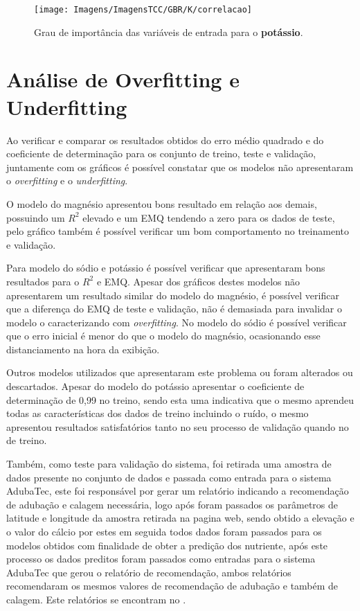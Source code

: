 \documentclass[
12pt,				%
oneside,			%
a4paper,			%
english,			%
french,				%
spanish,			%
brazil				%
]{abntex2}
\begin{document}
\begin{figure}[H]
	\caption{Grau de importância das variáveis de entrada para o \textbf{potássio}.}
	\centering %
	\texttt{[image: Imagens/ImagensTCC/GBR/K/correlacao]} %
	\label{fig:gkcorrelacao}
\end{figure}

\section{Análise de Overfitting e Underfitting}

Ao verificar e comparar os resultados obtidos do erro médio quadrado e do coeficiente de determinação para os conjunto de treino, teste e validação, juntamente com os gráficos é possível constatar que os modelos  não apresentaram o \textit{overfitting} e o \textit{underfitting}. 

O modelo do magnésio apresentou bons resultado em relação aos demais, possuindo um $R^2$ elevado e um EMQ tendendo a zero para os dados de teste, pelo gráfico também é possível verificar um bom comportamento no treinamento e validação. 

Para modelo do sódio e potássio é possível verificar que apresentaram bons resultados para o $R^2$ e EMQ. Apesar dos gráficos destes modelos não apresentarem um resultado similar do modelo do magnésio, é possível verificar que a diferença do EMQ de teste e validação, não é demasiada para invalidar o modelo o caracterizando com \textit{overfitting}. No modelo do sódio é possível verificar que o erro inicial é menor do que o modelo do magnésio, ocasionando esse distanciamento na hora da exibição.   

Outros modelos utilizados que apresentaram este problema ou foram alterados ou descartados. Apesar do modelo do potássio apresentar o coeficiente de determinação de 0,99 no treino, sendo esta uma indicativa que o mesmo aprendeu todas as características dos dados de treino incluindo o ruído, o mesmo apresentou resultados satisfatórios tanto no seu processo de validação quando no de treino.

Também, como teste para validação do sistema, foi retirada uma amostra de dados presente no conjunto de dados e passada como entrada para o sistema AdubaTec, este foi responsável por gerar um relatório indicando a recomendação de adubação e calagem necessária, logo após foram passados os parâmetros de latitude e longitude da amostra retirada na pagina web, sendo obtido a elevação e o valor do cálcio por estes em seguida todos dados foram passados para os modelos obtidos com finalidade de obter a predição dos nutriente, após este processo os dados preditos foram passados como entradas para o sistema AdubaTec que gerou o relatório de recomendação, ambos relatórios recomendaram os mesmos valores de recomendação de adubação e também de calagem.  Este relatórios se encontram no .
\end{document}
